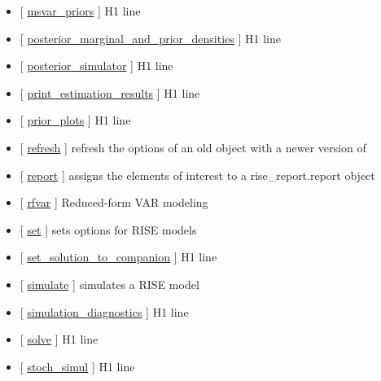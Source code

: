 \documentclass[letterpaper,10pt,english]{sphinxmanual}
\begin{document}
\begin{itemize}
\item {} 
{[} {\hyperref[classes/models/@rfvar/rfvar:msvar-priors]{msvar\_priors}} {]}   H1 line

\item {} 
{[} {\hyperref[classes/models/@rfvar/rfvar:posterior-marginal-and-prior-densities]{posterior\_marginal\_and\_prior\_densities}} {]}   H1 line

\item {} 
{[} {\hyperref[classes/models/@rfvar/rfvar:posterior-simulator]{posterior\_simulator}} {]}   H1 line

\item {} 
{[} {\hyperref[classes/models/@rfvar/rfvar:print-estimation-results]{print\_estimation\_results}} {]}   H1 line

\item {} 
{[} {\hyperref[classes/models/@rfvar/rfvar:prior-plots]{prior\_plots}} {]}   H1 line

\item {} 
{[} {\hyperref[classes/models/@rfvar/rfvar:refresh]{refresh}} {]}  refresh the options of an old object with a newer version of

\item {} 
{[} {\hyperref[classes/models/@rfvar/rfvar:report]{report}} {]} assigns the elements of interest to a rise\_report.report object

\item {} 
{[} {\hyperref[classes/models/@rfvar/rfvar:rfvar]{rfvar}} {]} Reduced-form VAR modeling

\item {} 
{[} {\hyperref[classes/models/@rfvar/rfvar:set]{set}} {]}  sets options for RISE models

\item {} 
{[} {\hyperref[classes/models/@rfvar/rfvar:set-solution-to-companion]{set\_solution\_to\_companion}} {]}   H1 line

\item {} 
{[} {\hyperref[classes/models/@rfvar/rfvar:simulate]{simulate}} {]}  simulates a RISE model

\item {} 
{[} {\hyperref[classes/models/@rfvar/rfvar:simulation-diagnostics]{simulation\_diagnostics}} {]}   H1 line

\item {} 
{[} {\hyperref[classes/models/@rfvar/rfvar:solve]{solve}} {]}   H1 line

\item {} 
{[} {\hyperref[classes/models/@rfvar/rfvar:stoch-simul]{stoch\_simul}} {]}   H1 line


\end{itemize}
\end{document}
